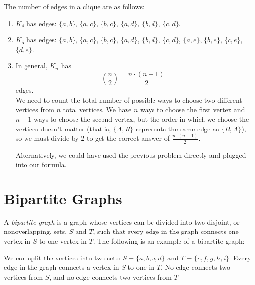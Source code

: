 \documentclass[11pt]{article}
\begin{document}
\begin{solution} 
The number of edges in a clique are as follows:
\begin{enumerate}[label=(\alph*)]
\item $K_4$ has  edges: $\{a, b\}$, $\{a, c\}$, $\{b, c\}$, $\{a, d\}$, $\{b, d\}$, $\{c, d\}$.
\item $K_5$ has  edges: $\{a, b\}$, $\{a, c\}$, $\{b, c\}$, $\{a, d\}$, $\{b, d\}$, $\{c, d\}$, $\{a, e\}$, $\{b, e\}$, $\{c, e\}$, $\{d,e\}$.
\item In general, $K_n$ has
\[\binom{n}{2} = \boxed{\frac{n \cdot (n - 1)}{2}}\]
edges. \\
We need to count the total number of possible ways to choose two different vertices from $n$ total vertices. We have $n$ ways to choose the first vertex
and $n - 1$ ways to choose the second vertex, but the order in which we choose the vertices doesn't matter (that is, $\{A,B\}$ represents the same edge
as $\{B, A\}$), so we must divide by 2 to get the correct answer of $\frac{n \cdot (n - 1)}{2}$.

Alternatively, we could have used the previous problem directly and plugged into our formula.
\end{enumerate}
\end{solution}

\section{Bipartite Graphs}

\begin{definition}
\label{def:bipartite}
A \textit{bipartite graph} is a graph whose vertices can be divided into two disjoint, or nonoverlapping, sets, $S$ and $T$, such that every
edge in the graph connects one vertex in $S$ to one vertex in $T$. The following is an example of a bipartite graph:
\begin{center}
\end{center}
We can split the vertices into two sets: $S=\{a,b,c,d\}$ and $T=\{e,f,g,h,i\}$. Every edge in the graph connects a vertex in $S$ to
one in $T$. No edge connects two vertices from $S$, and no edge connects two vertices from $T$.
\end{definition}
\end{document}
